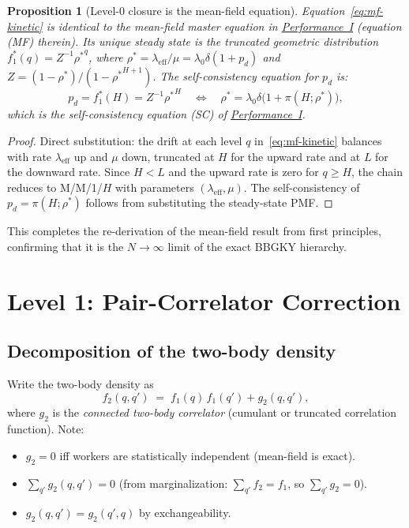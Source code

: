 \documentclass[11pt,a4paper]{article}
\newtheorem{proposition}[theorem]{Proposition}
\newcommand{\rhostar}{\rho^{*}}
\newcommand{\pd}{p_d}
\newcommand{\fone}{f_1}
\newcommand{\ftwo}{f_2}
\newcommand{\gtwo}{g_2}
\begin{document}
\begin{proposition}[Level-0 closure is the mean-field equation]
\label{prop:mf-recovery}
Equation~\eqref{eq:mf-kinetic} is identical to the mean-field master equation
in \hyperref[chap:load_balance]{Performance~I} (equation (MF) therein).
Its unique steady state is the truncated geometric distribution
$\fone^*(q) = Z^{-1} {\rhostar}^q$, where
$\rhostar = \lambda_{\mathrm{eff}} / \mu = \lambda_0 \delta (1 + \pd)$
and $Z = (1-\rhostar)/(1-{\rhostar}^{H+1})$.
The self-consistency equation for $\pd$ is:
\begin{equation}
  \pd = \fone^*(H) = Z^{-1} {\rhostar}^H
  \quad\Longleftrightarrow\quad
  \rhostar = \lambda_0 \delta\bigl(1 + \pi(H;\rhostar)\bigr),
  \label{eq:sc-mf}
\end{equation}
which is the self-consistency equation (SC) of \hyperref[chap:load_balance]{Performance~I}.
\end{proposition}

\begin{proof}
Direct substitution: the drift at each level $q$ in~\eqref{eq:mf-kinetic}
balances with rate $\lambda_{\mathrm{eff}}$ up and $\mu$ down, truncated at $H$
for the upward rate and at $L$ for the downward rate.
Since $H < L$ and the upward rate is zero for $q \geq H$, the chain
reduces to M/M/1/$H$ with parameters $(\lambda_{\mathrm{eff}}, \mu)$.
The self-consistency of $\pd = \pi(H; \rhostar)$ follows from substituting
the steady-state PMF.
\end{proof}

This completes the re-derivation of the mean-field result from first principles,
confirming that it is the $N \to \infty$ limit of the exact BBGKY hierarchy.

\section{Level 1: Pair-Correlator Correction}

\subsection{Decomposition of the two-body density}

Write the two-body density as
\begin{equation}
  \ftwo(q, q') \;=\; \fone(q)\,\fone(q') + \gtwo(q, q'),
  \label{eq:g2-decomp}
\end{equation}
where $\gtwo$ is the \emph{connected two-body correlator}
(cumulant or truncated correlation function).
Note:
\begin{itemize}
  \item $\gtwo = 0$ iff workers are statistically independent
        (mean-field is exact).
  \item $\sum_{q'} \gtwo(q, q') = 0$ (from marginalization:
        $\sum_{q'} \ftwo = \fone$, so $\sum_{q'} \gtwo = 0$).
  \item $\gtwo(q, q') = \gtwo(q', q)$ by exchangeability.
\end{itemize}
\end{document}
